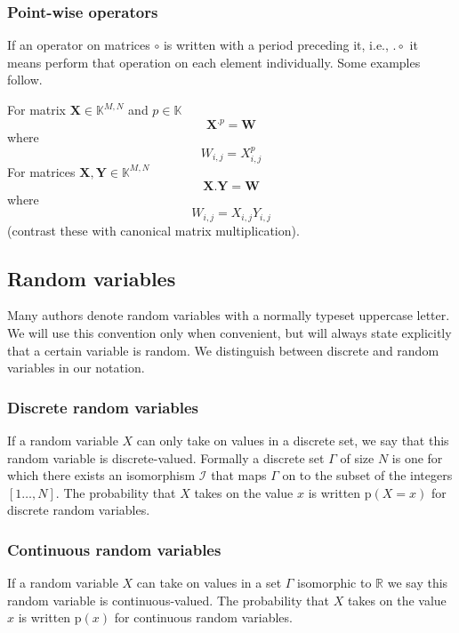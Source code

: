 \subsubsection{Point-wise operators}

If an operator on matrices $\circ$ is written with a period preceding it, i.e.,
$.\circ$ it
means perform that operation on each element individually. Some examples follow.

For matrix $\boldsymbol{X} \in \mathbb{K}^{M,N}$ and $p \in \mathbb{K}$
\[
    \boldsymbol{X}^{.p} = \boldsymbol{W}
\] where
\[
    W_{i,j}=X_{i,j}^{p}
\]
For matrices $\boldsymbol{X},\boldsymbol{Y} \in \mathbb{K}^{M,N}$
\[
    \boldsymbol{X}.\boldsymbol{Y} = \boldsymbol{W}
\] where
\[
    W_{i,j}=X_{i,j}Y_{i,j}
\]
(contrast these with canonical matrix multiplication).

\subsection{Random variables}

Many authors denote random variables with a normally typeset uppercase letter.
We will use this convention only when convenient, but will always state
explicitly that a certain variable is random. We distinguish between discrete and
random variables in our notation.

\subsubsection{Discrete random variables}

If a random variable $X$ can only take on values in a discrete set, we say that this
random variable is discrete-valued. Formally a discrete set $\Gamma$ of size $N$
is one for which there exists an isomorphism $\mathscr{I}$ that maps $\Gamma$ on
to the subset of the integers $[1 \dotsc, N]$. The probability that $X$ takes on
the value $x$ is written $\mathrm{p}(X=x)$ for discrete random variables.

\subsubsection{Continuous random variables}

If a random variable $X$ can take on values in a set $\Gamma$ isomorphic to
$\mathbb{R}$ we say this random variable is continuous-valued. The probability
that $X$ takes on the value $x$ is written $\mathrm{p}(x)$ for continuous random
variables.

